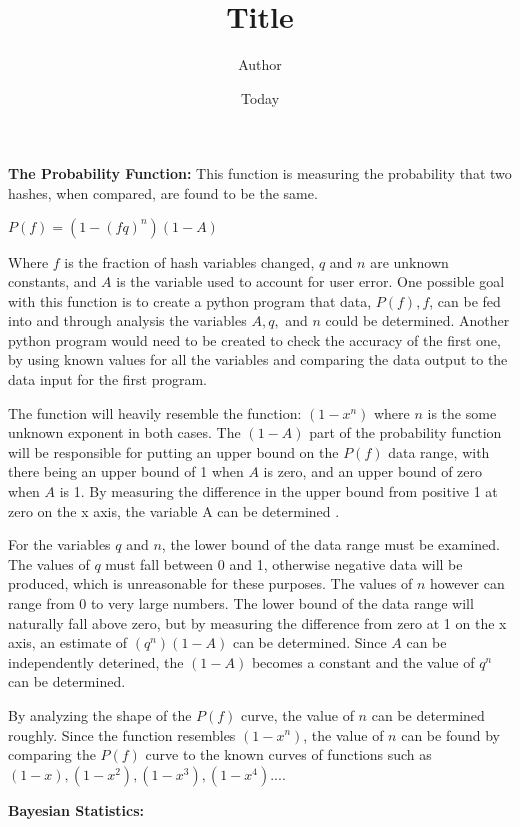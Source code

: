 \documentclass[]{minimal}
\begin{document}
\title{Title}
\author{Author}
\date{Today}


\textbf{The Probability Function:}\newline
This function is measuring the probability that two hashes, when compared, are found to be the same.\newline
\begin{center}$P(f) = (1-(fq)^n)(1-A)$
\end{center}
Where $f$ is the fraction of hash variables changed, $q$ and $n$ are unknown constants, and $A$ is the variable used to account for user error.  One possible goal with this function is to create a python program that data, $P(f),f$, can be fed into and through analysis the variables $A,q,$ and $n$  could be determined. Another  python program would need to be created to check the accuracy of the first one, by using known values for all the variables and comparing the data output to the data input for the first program.   \par
The function will heavily resemble the function: $(1-x^n)$ where $n$ is the some unknown exponent in both cases. The $(1-A)$ part of the probability function will be responsible for putting an upper bound on the $P(f)$ data range, with there being an upper bound of 1 when $A$ is zero, and an upper bound of zero when $A$ is 1. By measuring the difference in the upper bound from positive 1 at zero on the x axis, the variable A can be determined . \par
 For the variables $q$ and $n$, the lower bound of the data range must be examined. The values of $q$ must fall between 0 and 1, otherwise negative data will be produced, which is unreasonable for these purposes. The values of $n
$ however can range from 0 to very large numbers. The lower bound of the data range will naturally fall above zero, but by measuring the difference from zero at 1 on the x axis, an estimate of $(q^n)(1-A)$ can be determined. Since $A$ can be independently deterined, the $(1-A)$ becomes a constant and the value of $q^n$ can be determined. \par 
By analyzing the shape of the $P(f)$ curve, the value of $n$ can be determined roughly. Since the function resembles $(1-x^n)$, the value of $n$ can be found by comparing the $P(f)$ curve to the known curves of functions such as $(1-x),(1-x^2),(1-x^3),(1-x^4)...$. \newline
\par \textbf{Bayesian Statistics:}
\end{document}
